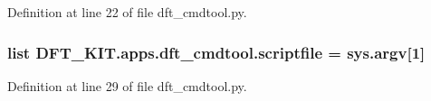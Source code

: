 Definition at line 22 of file dft\+\_\+cmdtool.\+py.

\hypertarget{namespace_d_f_t___k_i_t_1_1apps_1_1dft__cmdtool_ad9689f4893a4dde9249d301ef1d932e0}{
\subsubsection[{scriptfile}]{\setlength{\rightskip}{0pt plus 5cm}list D\+F\+T\+\_\+\+K\+I\+T.\+apps.\+dft\+\_\+cmdtool.\+scriptfile = sys.\+argv\mbox{[}1\mbox{]}}}\label{namespace_d_f_t___k_i_t_1_1apps_1_1dft__cmdtool_ad9689f4893a4dde9249d301ef1d932e0}


Definition at line 29 of file dft\+\_\+cmdtool.\+py.

